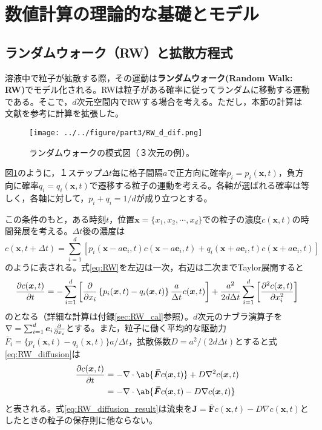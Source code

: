 \documentclass[autodetect-engine,dvi=dvipdfmx,a4paper,ja=standard,oneside,openany,11pt]{bxjsbook}
\begin{document}
\section{数値計算の理論的な基礎とモデル}
\subsection{ランダムウォーク（RW）と拡散方程式}
\label{sec:RW}
溶液中で粒子が拡散する際，その運動は\textbf{ランダムウォーク(Random Walk: RW)}でモデル化される。RWは粒子がある確率に従ってランダムに移動する運動である。そこで，$d$次元空間内でRWする場合を考える。ただし，本節の計算は文献\cite{フラクタル科学}\cite{フラクタルの物理Ⅱ}を参考に計算を拡張した。
\begin{figure}[htbp]
  \centering
  \texttt{[image: ../../figure/part3/RW\_d\_dif.png]}
  \caption{ランダムウォークの模式図（３次元の例）。}
  \label{fig:random_walk}
\end{figure}
図\ref{fig:random_walk}のように，１ステップ$\Delta t$毎に格子間隔$a$で正方向に確率$p_i=p_i(\bm{x},t)$，負方向に確率$q_i=q_i(\bm{x},t)$で遷移する粒子の運動を考える。各軸が選ばれる確率は等しく，各軸に対して，$p_i+q_i=1/d$が成り立つとする。

この条件のもと，ある時刻$t$，位置$\bm{x}=\{x_1,x_2,\cdots,x_d\}$での粒子の濃度$c(\bm{x},t)$の時間発展を考える。$\Delta t$後の濃度は
\begin{equation}
  c(\bm{x},t+\Delta t)=\sum_{i=1}^{d}\left[p_i(\bm{x}-a\bm{e}_i,t) c(\bm{x}-a\bm{e}_i,t)+q_i(\bm{x}+a\bm{e}_i,t) c(\bm{x}+a\bm{e}_i,t)\right]
  \label{eq:RW}
\end{equation}
のように表される。式\eqref{eq:RW}を左辺は一次，右辺は二次までTaylor展開すると
\begin{equation}
  \pdv{c(\bm{x},t)}{t}=-\sum_{i=1}^{d}\left[\pdv*{\left\{p_i(\bm{x},t)-q_i(\bm{x},t)\right\}\frac{a}{\Delta t}c(\bm{x},t)}{x_i}\right]+\frac{a^2}{2d\Delta t}\sum_{i=1}^{d}\left[\pdv[2]{c(\bm{x},t)}{x_i}\right]
  \label{eq:RW_diffusion}
\end{equation}
のとなる（詳細な計算は付録\ref{sec:RW_cal}参照）。$d$次元のナブラ演算子を$\nabla=\sum_{i=1}^{d}\bm{e}_i\pdv*{}{x_i}$とする。また，粒子に働く平均的な駆動力$\bar{F}_i=\{p_i(\bm{x},t)-q_i(\bm{x},t)\}a/\Delta t$，拡散係数$D=a^2/(2d\Delta t)$とすると式\eqref{eq:RW_diffusion}は
\begin{equation}
  \begin{split}
    \pdv{c(\bm{x},t)}{t} & =-\nabla\cdot\ab\{ \bm{\bar{F}}c(\bm{x},t)\}+D\nabla^2 c(\bm{x},t) \\
                         & =-\nabla\cdot\ab\{\bm{\bar{F}}c(\bm{x},t)-D\nabla c(\bm{x},t)\}
  \end{split}
  \label{eq:RW_diffusion_result}
\end{equation}
と表される。式\eqref{eq:RW_diffusion_result}は流束を$\bm{J}=\bm{\bar{F}}c(\bm{x},t)-D\nabla c(\bm{x},t)$としたときの粒子の保存則に他ならない。
\end{document}
